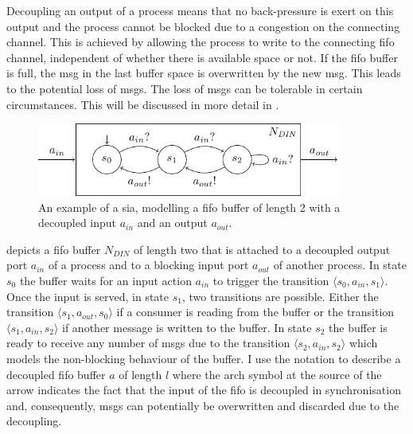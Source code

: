 Decoupling an output of a process means that no back-pressure is exert on this output and the process cannot be blocked due to a congestion on the connecting channel.
This is achieved by allowing the process to write to the connecting \gls{fifo} channel, independent of whether there is available space or not.
If the \gls{fifo} buffer is full, the \gls*{msg} in the last buffer space is overwritten by the new \gls*{msg}.
This leads to the potential loss of \glspl*{msg}.
The loss of \glspl*{msg} can be tolerable in certain circumstances.
This will be discussed in more detail in \Sect{\ref{sect_tcm_msg}}.
\begin{figure}[bht]
    \TopFigSpace
    \centering
    \includegraphics[width=10cm]{fig/sia_cci_in.pdf}
    \CaptionFigSpace
    \caption{An example of a \gls{sia}, modelling a \gls{fifo} buffer of length 2 with a decoupled input $a_{in}$ and an output $a_{out}$.}
    \label{fig_sia_cci_in}
    \BotFigSpace
\end{figure}
\Fig{\ref{fig_sia_cci_in}} depicts a \gls{fifo} buffer $N_{\mathit{DIN}}$ of length two that is attached to a decoupled output port $a_{in}$ of a process and to a blocking input port $a_{out}$ of another process.
In state $s_0$ the buffer waits for an input action $a_{in}$ to trigger the transition $\langle s_0, a_{in}, s_1 \rangle$.
Once the input is served, in state $s_1$, two transitions are possible.
Either the transition $\langle s_1, a_{out}, s_0 \rangle$ if a consumer is reading from the buffer or the transition $\langle s_1, a_{in}, s_2 \rangle$ if another message is written to the buffer.
In state $s_2$ the buffer is ready to receive any number of \glspl*{msg} due to the transition $\langle s_2, a_{in}, s_2 \rangle$ which models the non-blocking behaviour of the buffer.
I use the notation  to describe a decoupled \gls{fifo} buffer $a$ of length $l$ where the arch symbol at the source of the arrow indicates the fact that the input of the \gls{fifo} is decoupled in synchronisation and, consequently, \glspl*{msg} can potentially be overwritten and discarded due to the decoupling.


